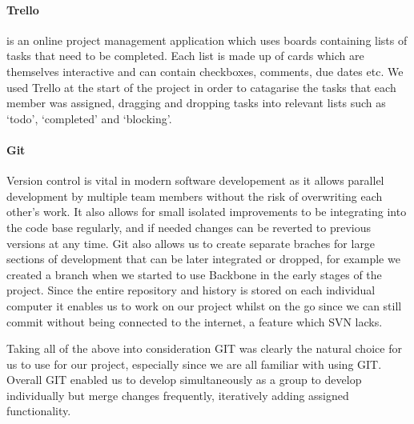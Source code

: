     \paragraph{Trello\cite{trello}} is an online project management application which uses boards containing lists of tasks that need to be completed. Each list is made up of cards which are themselves interactive and can contain checkboxes, comments, due dates etc. We used Trello at the start of the project in order to catagarise the tasks that each member was assigned, dragging and dropping tasks into relevant lists such as `todo', `completed' and `blocking'.

    \paragraph{Git\cite{git}} Version control is vital in modern software developement as it allows parallel development by multiple team members without the risk of overwriting each other's work. It also allows for small isolated improvements to be integrating into the code base regularly, and if needed changes can be reverted to previous versions at any time. Git also allows us to create separate braches for large sections of development that can be later integrated or dropped, for example we created a branch when we started to use Backbone in the early stages of the project.
    Since the entire repository and history is stored on each individual computer it enables us to work on our project whilst on the go since we can still commit without being connected to the internet, a feature which SVN lacks.

    Taking all of the above into consideration GIT was clearly the natural choice for us to use for our project, especially since we are all familiar with using GIT.
    Overall GIT enabled us to develop simultaneously as a group to develop individually but merge changes frequently, iteratively adding assigned functionality.
